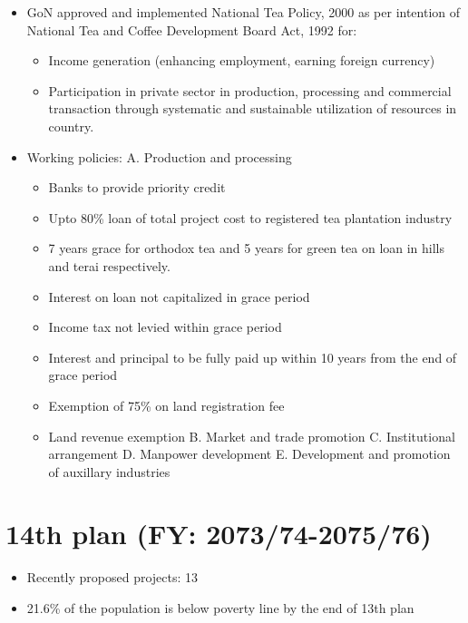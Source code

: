 \documentclass[
]{book}
\providecommand{\tightlist}{%
  \setlength{\itemsep}{0pt}\setlength{\parskip}{0pt}}
\begin{document}
\begin{itemize}
\tightlist
\item
  GoN approved and implemented National Tea Policy, 2000 as per intention of National Tea and Coffee Development Board Act, 1992 for:

  \begin{itemize}
  \tightlist
  \item
    Income generation (enhancing employment, earning foreign currency)
  \item
    Participation in private sector in production, processing and commercial transaction through systematic and sustainable utilization of resources in country.
  \end{itemize}
\item
  Working policies:
  A. Production and processing

  \begin{itemize}
  \tightlist
  \item
    Banks to provide priority credit
  \item
    Upto 80\% loan of total project cost to registered tea plantation industry
  \item
    7 years grace for orthodox tea and 5 years for green tea on loan in hills and terai respectively.
  \item
    Interest on loan not capitalized in grace period
  \item
    Income tax not levied within grace period
  \item
    Interest and principal to be fully paid up within 10 years from the end of grace period
  \item
    Exemption of 75\% on land registration fee
  \item
    Land revenue exemption
    B. Market and trade promotion
    C. Institutional arrangement
    D. Manpower development
    E. Development and promotion of auxillary industries
  \end{itemize}
\end{itemize}

\hypertarget{th-plan-fy-207374-207576}{%
\section{14th plan (FY: 2073/74-2075/76)}\label{th-plan-fy-207374-207576}}

\begin{itemize}
\tightlist
\item
  Recently proposed projects: 13
\item
  21.6\% of the population is below poverty line by the end of 13th plan
\end{itemize}
\end{document}
